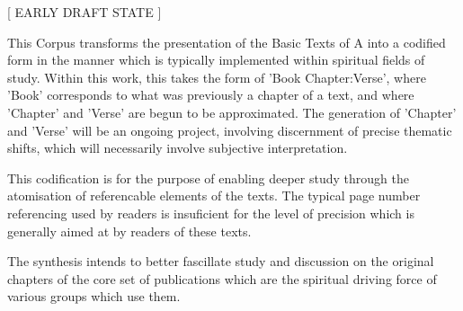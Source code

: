\begin{fmatterchapter}


\begin{center}[ EARLY DRAFT STATE ]\end{center}

This Corpus transforms the presentation of the Basic Texts of A 
    into a codified form 
    in the manner which is typically implemented 
    within spiritual fields of study.
Within this work, this takes the form of 'Book Chapter:Verse', 
    where 'Book' corresponds to what was previously a chapter of a text, 
    and where 'Chapter' and 'Verse' are begun to be approximated.
The generation of 'Chapter' and 'Verse' will be an ongoing project,
    involving discernment of precise thematic shifts,
    which will necessarily involve subjective interpretation.

This codification is for the purpose of enabling deeper study 
    through the atomisation of referencable elements of the texts. 
The typical page number referencing used by readers 
    is insuficient for the level of precision 
    which is generally aimed at by readers of these texts.

The synthesis intends to better fascillate study and discussion 
    on the original chapters of the core set of publications 
    which are the spiritual driving force of various groups which use them.

\end{fmatterchapter}
